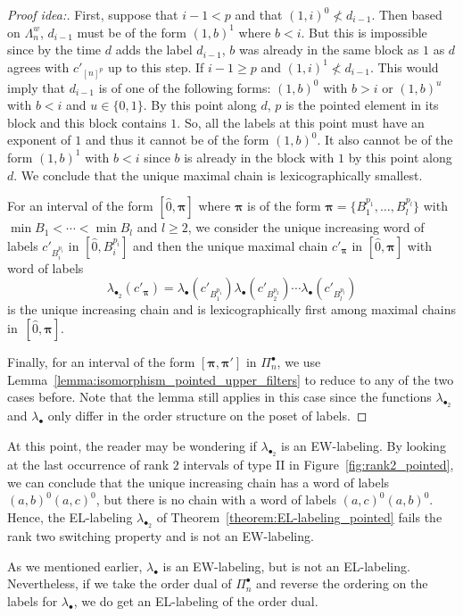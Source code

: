 \documentclass[11pt]{article}
\theoremstyle{definition}
\numberwithin{equation}{section}
\newcommand{\bpi}{\pmb{\pi}}
\begin{document}
\begin{proof}[Proof idea:]
First, suppose that $i-1<p$ and that  $(1,i)^0 \not < d_{i-1}$.  Then based on $\Lambda_n^w$, $d_{i-1}$ must be of the form $(1,b)^1$ where $b<i$.  But this is impossible since by the time $d$ adds the label $d_{i-1}$, $b$ was already in the same block as $1$ as $d$ agrees with $c'_{[n]^p}$ up to this step.  If $i-1\geq p$ and $(1,i)^1 \not < d_{i-1}$. This would imply that $d_{i-1}$ is of one of the following forms: $(1,b)^0$ with $b>i$ or $(1,b)^u$ with $b< i$ and $u\in \{0,1\}$.   By this point along $d$, $p$ is the pointed element in its block and this block contains $1$.  So, all the labels at this point must have an exponent of $1$ and thus it cannot be of the form $(1,b)^0$.  It also cannot be  of the form $(1,b)^1$ with $b<i$ since $b$ is already in the block with $1$ by this point along $d$. We conclude that the unique maximal chain is lexicographically smallest. 

For an interval of the form $[\hat{0},\bpi]$ where $\bpi$ is of the form $\bpi=\{B_1^{p_1},\dots,B_l^{p_l}\}$ with $\min B_1 <\cdots <\min B_l$ and $l\ge 2$, we consider the unique increasing word of labels $c'_{B_i^{p_i}}$ in $[\hat{0},B_i^{p_i}]$  and then the unique maximal chain  $c'_{\bpi}$ in  $[\hat{0},\bpi]$ with word of labels
$$\lambda_{\bullet_2}(c'_{\bpi})=\lambda_{\bullet}(c'_{B_1^{p_1}})\lambda_{\bullet}(c'_{B_2^{p_2}})\cdots\lambda_{\bullet}(c'_{B_l^{p_l}})$$
is the unique increasing chain and is lexicographically first among maximal chains  in~$[\hat{0},\bpi]$.

Finally, for an interval of the form $[\bpi, \bpi']$ in $\Pi_n^{\bullet}$, we use Lemma~\ref{lemma:isomorphism_pointed_upper_filters} to reduce to any of the two cases before. Note that the lemma still applies in this case since the functions $\lambda_{\bullet_2}$ and  $\lambda_{\bullet}$    only differ in the  order structure on the poset of labels.
\end{proof}


At this point, the reader may be wondering if  $\lambda_{\bullet_2}$ is an EW-labeling. By looking at the last occurrence of rank $2$ intervals of type II in Figure~\ref{fig:rank2_pointed}, we can conclude that the unique increasing chain has a word of labels $(a,b)^0(a,c)^0$, but there is no chain with a word of labels $(a,c)^0(a,b)^0$. Hence, the EL-labeling $\lambda_{\bullet_2}$ of Theorem~\ref{theorem:EL-labeling_pointed} fails the rank two switching property and is not an EW-labeling.  

As we mentioned earlier, $\lambda_\bullet$ is an EW-labeling, but is not an EL-labeling. Nevertheless, if we take the order dual of $\Pi_n^\bullet$ and reverse the ordering on the labels for $\lambda_{\bullet}$, we do get an EL-labeling of the order dual.  
\end{document}
